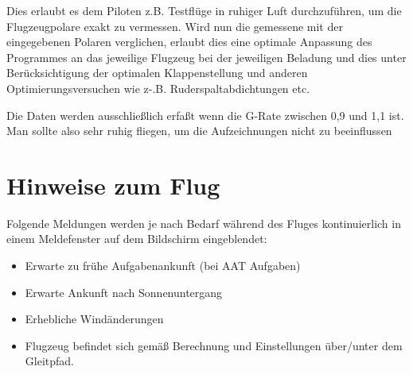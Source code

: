 Dies erlaubt es dem Piloten z.B. Testflüge in ruhiger Luft durchzuführen, um die Flugzeugpolare exakt zu vermessen.
Wird nun die gemessene  mit der eingegebenen Polaren verglichen, erlaubt dies eine optimale Anpassung des Programmes an das jeweilige Flugzeug bei der jeweiligen Beladung und dies unter Berücksichtigung der optimalen Klappenstellung und anderen Optimierungsversuchen wie z-.B. Ruderspaltabdichtungen etc.

Die Daten werden ausschließlich erfaßt wenn die G-Rate zwischen 0,9 und 1,1 ist.
Man sollte also sehr ruhig fliegen, um die Aufzeichnungen nicht zu beeinflussen



\section{Hinweise zum Flug}
Folgende Meldungen werden je nach Bedarf während des Fluges kontinuierlich in einem
Meldefenster auf dem Bildschirm eingeblendet:

\begin{itemize}
\item Erwarte zu frühe Aufgabenankunft (bei AAT Aufgaben)
\item Erwarte Ankunft nach Sonnenuntergang
\item Erhebliche Windänderungen
\item Flugzeug befindet sich gemäß Berechnung und Einstellungen  über/unter dem Gleitpfad.
\end{itemize}
